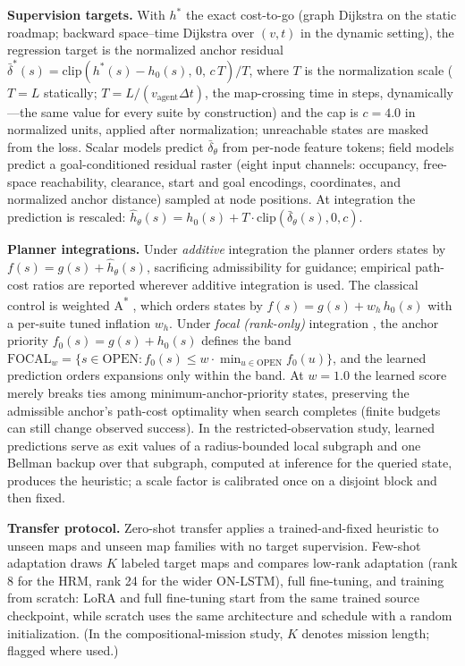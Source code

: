 \documentclass[letterpaper]{article} %
\begin{document}
\textbf{Supervision targets.} With $h^{*}$ the exact cost-to-go (graph Dijkstra on the static roadmap; backward space--time Dijkstra over $(v,t)$ in the dynamic setting), the regression target is the normalized anchor residual $\bar\delta^{*}(s) = \mathrm{clip}\!\left(h^{*}(s) - h_0(s),\, 0,\, c\,T\right)/T$, where $T$ is the normalization scale ($T{=}L$ statically; $T = L/(v_{\mathrm{agent}}\Delta t)$, the map-crossing time in steps, dynamically---the same value for every suite by construction) and the cap is $c{=}4.0$ in normalized units, applied after normalization; unreachable states are masked from the loss. Scalar models predict $\bar\delta_\theta$ from per-node feature tokens; field models predict a goal-conditioned residual raster (eight input channels: occupancy, free-space reachability, clearance, start and goal encodings, coordinates, and normalized anchor distance) sampled at node positions. At integration the prediction is rescaled: $\hat h_\theta(s) = h_0(s) + T \cdot \mathrm{clip}(\bar\delta_\theta(s), 0, c)$.

\textbf{Planner integrations.} Under \emph{additive} integration the planner orders states by $f(s) = g(s) + \hat h_\theta(s)$, sacrificing admissibility for guidance; empirical path-cost ratios are reported wherever additive integration is used. The classical control is weighted A\textsuperscript{*} \citep{pohl1970}, which orders states by $f(s) = g(s) + w_h\, h_0(s)$ with a per-suite tuned inflation $w_h$. Under \emph{focal (rank-only)} integration \citep{pohl1970,pearl1982semiadmissible}, the anchor priority $f_0(s) = g(s) + h_0(s)$ defines the band $\mathrm{FOCAL}_w = \{ s \in \mathrm{OPEN} : f_0(s) \leq w \cdot \min_{u \in \mathrm{OPEN}} f_0(u) \}$, and the learned prediction orders expansions only within the band. At $w{=}1.0$ the learned score merely breaks ties among minimum-anchor-priority states, preserving the admissible anchor's path-cost optimality when search completes (finite budgets can still change observed success). In the restricted-observation study, learned predictions serve as exit values of a radius-bounded local subgraph and one Bellman backup over that subgraph, computed at inference for the queried state, produces the heuristic; a scale factor is calibrated once on a disjoint block and then fixed.

\textbf{Transfer protocol.} Zero-shot transfer applies a trained-and-fixed heuristic to unseen maps and unseen map families with no target supervision. Few-shot adaptation draws $K$ labeled target maps and compares low-rank adaptation \citep[LoRA;][]{hu2021lora} (rank 8 for the HRM, rank 24 for the wider ON-LSTM), full fine-tuning, and training from scratch: LoRA and full fine-tuning start from the same trained source checkpoint, while scratch uses the same architecture and schedule with a random initialization. (In the compositional-mission study, $K$ denotes mission length; flagged where used.)
\end{document}
